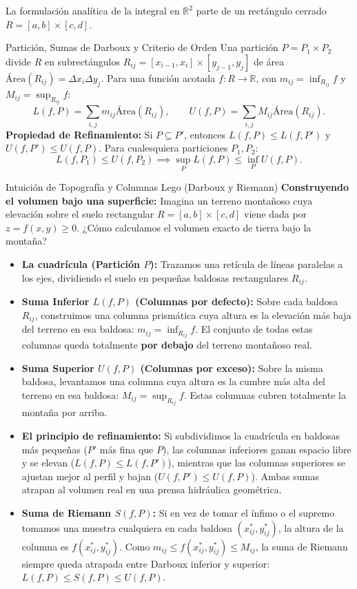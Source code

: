\documentclass[11pt,a4paper]{article}
\begin{document}
La formulación analítica de la integral en $\mathbb{R}^2$ parte de un rectángulo cerrado $R = [a,b] \times [c,d]$.

\begin{theorempage}{Partición, Sumas de Darboux y Criterio de Orden}
Una partición $P = P_1 \times P_2$ divide $R$ en subrectángulos $R_{ij} = [x_{i-1}, x_i] \times [y_{j-1}, y_j]$ de área $\text{Área}(R_{ij}) = \Delta x_i \Delta y_j$.
Para una función acotada $f: R \to \mathbb{R}$, con $m_{ij} = \inf_{R_{ij}} f$ y $M_{ij} = \sup_{R_{ij}} f$:
\[
L(f, P) = \sum_{i,j} m_{ij} \text{Área}(R_{ij}), \qquad U(f, P) = \sum_{i,j} M_{ij} \text{Área}(R_{ij}).
\]
\textbf{Propiedad de Refinamiento:} Si $P \subseteq P'$, entonces $L(f, P) \le L(f, P')$ y $U(f, P') \le U(f, P)$.
Para cualesquiera particiones $P_1, P_2$:
\[
L(f, P_1) \le U(f, P_2) \implies \sup_P L(f, P) \le \inf_P U(f, P).
\]
\end{theorempage}

\begin{intuitionbox}{Intuición de Topografía y Columnas Lego (Darboux y Riemann)}
\textbf{Construyendo el volumen bajo una superficie:} Imagina un terreno montañoso cuya elevación sobre el suelo rectangular $R = [a,b] \times [c,d]$ viene dada por $z = f(x,y) \ge 0$. ¿Cómo calculamos el volumen exacto de tierra bajo la montaña?
\begin{itemize}[noitemsep]
    \item \textbf{La cuadrícula (Partición $P$):} Trazamos una retícula de líneas paralelas a los ejes, dividiendo el suelo en pequeñas baldosas rectangulares $R_{ij}$.
    \item \textbf{Suma Inferior $L(f, P)$ (Columnas por defecto):} Sobre cada baldosa $R_{ij}$, construimos una columna prismática cuya altura es la elevación más baja del terreno en esa baldosa: $m_{ij} = \inf_{R_{ij}} f$. El conjunto de todas estas columnas queda totalmente \textbf{por debajo} del terreno montañoso real.
    \item \textbf{Suma Superior $U(f, P)$ (Columnas por exceso):} Sobre la misma baldosa, levantamos una columna cuya altura es la cumbre más alta del terreno en esa baldosa: $M_{ij} = \sup_{R_{ij}} f$. Estas columnas cubren totalmente la montaña por arriba.
    \item \textbf{El principio de refinamiento:} Si subdividimos la cuadrícula en baldosas más pequeñas ($P'$ más fina que $P$), las columnas inferiores ganan espacio libre y se elevan ($L(f, P) \le L(f, P')$), mientras que las columnas superiores se ajustan mejor al perfil y bajan ($U(f, P') \le U(f, P)$). Ambas sumas atrapan al volumen real en una prensa hidráulica geométrica.
    \item \textbf{Suma de Riemann $S(f, P)$:} Si en vez de tomar el ínfimo o el supremo tomamos una muestra cualquiera en cada baldosa $(x_{ij}^*, y_{ij}^*)$, la altura de la columna es $f(x_{ij}^*, y_{ij}^*)$. Como $m_{ij} \le f(x_{ij}^*, y_{ij}^*) \le M_{ij}$, la suma de Riemann siempre queda atrapada entre Darboux inferior y superior: $L(f, P) \le S(f, P) \le U(f, P)$.
\end{itemize}
\end{intuitionbox}
\end{document}
